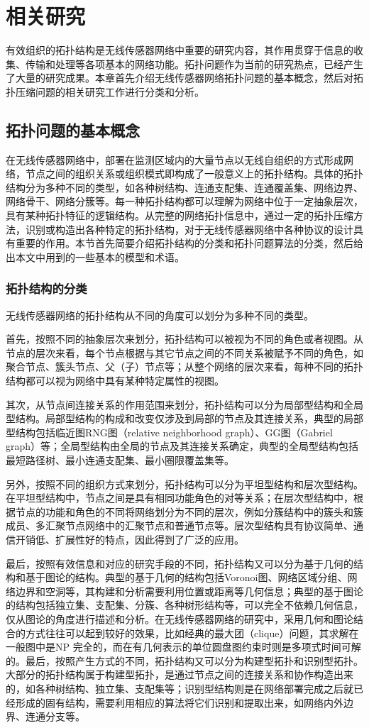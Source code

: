 \chapter{相关研究}
\label{chap:2}
有效组织的拓扑结构是无线传感器网络中重要的研究内容，其作用贯穿于信息的收集、传输和处理等各项基本的网络功能。拓扑问题作为当前的研究热点，已经产生了大量的研究成果。本章首先介绍无线传感器网络拓扑问题的基本概念，然后对拓扑压缩问题的相关研究工作进行分类和分析。
\section{拓扑问题的基本概念}
在无线传感器网络中，部署在监测区域内的大量节点以无线自组织的方式形成网络，节点之间的组织关系或组织模式即构成了一般意义上的拓扑结构。具体的拓扑结构分为多种不同的类型，如各种树结构、连通支配集、连通覆盖集、网络边界、网络骨干、网络分簇等。每一种拓扑结构都可以理解为网络中位于一定抽象层次，具有某种拓扑特征的逻辑结构。从完整的网络拓扑信息中，通过一定的拓扑压缩方法，识别或构造出各种特定的拓扑结构，对于无线传感器网络中各种协议的设计具有重要的作用。本节首先简要介绍拓扑结构的分类和拓扑问题算法的分类，然后给出本文中用到的一些基本的模型和术语。
\subsection{拓扑结构的分类}
无线传感器网络的拓扑结构从不同的角度可以划分为多种不同的类型。

首先，按照不同的抽象层次来划分，拓扑结构可以被视为不同的角色或者视图。从节点的层次来看，每个节点根据与其它节点之间的不同关系被赋予不同的角色，如聚合节点、簇头节点、父（子）节点等；从整个网络的层次来看，每种不同的拓扑结构都可以视为网络中具有某种特定属性的视图。

其次，从节点间连接关系的作用范围来划分，拓扑结构可以分为局部型结构和全局型结构。局部型结构的构成和改变仅涉及到局部的节点及其连接关系，典型的局部型结构包括临近图RNG图（relative neighborhood graph）、GG图（Gabriel graph）等；全局型结构由全局的节点及其连接关系确定，典型的全局型结构包括最短路径树、最小连通支配集、最小圈限覆盖集等。

另外，按照不同的组织方式来划分，拓扑结构可以分为平坦型结构和层次型结构。在平坦型结构中，节点之间是具有相同功能角色的对等关系；在层次型结构中，根据节点的功能和角色的不同将网络划分为不同的层次，例如分簇结构中的簇头和簇成员、多汇聚节点网络中的汇聚节点和普通节点等。层次型结构具有协议简单、通信开销低、扩展性好的特点，因此得到了广泛的应用。

最后，按照有效信息和对应的研究手段的不同，拓扑结构又可以分为基于几何的结构和基于图论的结构。典型的基于几何的结构包括Voronoi图、网络区域分组、网络边界和空洞等，其构建和分析需要利用位置或距离等几何信息；典型的基于图论的结构包括独立集、支配集、分簇、各种树形结构等，可以完全不依赖几何信息，仅从图论的角度进行描述和分析。在无线传感器网络的研究中，采用几何和图论结合的方式往往可以起到较好的效果，比如经典的最大团（clique）问题，其求解在一般图中是NP 完全的，而在有几何表示的单位圆盘图约束时则是多项式时间可解的。最后，按照产生方式的不同，拓扑结构又可以分为构建型拓扑和识别型拓扑。大部分的拓扑结构属于构建型拓扑，是通过节点之间的连接关系和协作构造出来的，如各种树结构、独立集、支配集等；识别型结构则是在网络部署完成之后就已经形成的固有结构，需要利用相应的算法将它们识别和提取出来，如网络内外边界、连通分支等。

